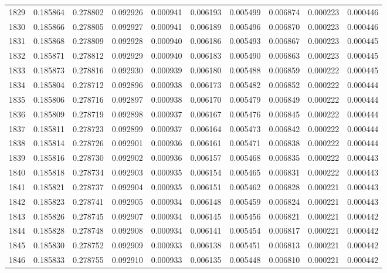 \begin{tabular}{lrrrrrrrrr}
1829 & 0.185864 & 0.278802 & 0.092926 & 0.000941 & 0.006193 & 0.005499 & 0.006874 & 0.000223 & 0.000446 \\
1830 & 0.185866 & 0.278805 & 0.092927 & 0.000941 & 0.006189 & 0.005496 & 0.006870 & 0.000223 & 0.000446 \\
1831 & 0.185868 & 0.278809 & 0.092928 & 0.000940 & 0.006186 & 0.005493 & 0.006867 & 0.000223 & 0.000445 \\
1832 & 0.185871 & 0.278812 & 0.092929 & 0.000940 & 0.006183 & 0.005490 & 0.006863 & 0.000223 & 0.000445 \\
1833 & 0.185873 & 0.278816 & 0.092930 & 0.000939 & 0.006180 & 0.005488 & 0.006859 & 0.000222 & 0.000445 \\
1834 & 0.185804 & 0.278712 & 0.092896 & 0.000938 & 0.006173 & 0.005482 & 0.006852 & 0.000222 & 0.000444 \\
1835 & 0.185806 & 0.278716 & 0.092897 & 0.000938 & 0.006170 & 0.005479 & 0.006849 & 0.000222 & 0.000444 \\
1836 & 0.185809 & 0.278719 & 0.092898 & 0.000937 & 0.006167 & 0.005476 & 0.006845 & 0.000222 & 0.000444 \\
1837 & 0.185811 & 0.278723 & 0.092899 & 0.000937 & 0.006164 & 0.005473 & 0.006842 & 0.000222 & 0.000444 \\
1838 & 0.185814 & 0.278726 & 0.092901 & 0.000936 & 0.006161 & 0.005471 & 0.006838 & 0.000222 & 0.000444 \\
1839 & 0.185816 & 0.278730 & 0.092902 & 0.000936 & 0.006157 & 0.005468 & 0.006835 & 0.000222 & 0.000443 \\
1840 & 0.185818 & 0.278734 & 0.092903 & 0.000935 & 0.006154 & 0.005465 & 0.006831 & 0.000222 & 0.000443 \\
1841 & 0.185821 & 0.278737 & 0.092904 & 0.000935 & 0.006151 & 0.005462 & 0.006828 & 0.000221 & 0.000443 \\
1842 & 0.185823 & 0.278741 & 0.092905 & 0.000934 & 0.006148 & 0.005459 & 0.006824 & 0.000221 & 0.000443 \\
1843 & 0.185826 & 0.278745 & 0.092907 & 0.000934 & 0.006145 & 0.005456 & 0.006821 & 0.000221 & 0.000442 \\
1844 & 0.185828 & 0.278748 & 0.092908 & 0.000934 & 0.006141 & 0.005454 & 0.006817 & 0.000221 & 0.000442 \\
1845 & 0.185830 & 0.278752 & 0.092909 & 0.000933 & 0.006138 & 0.005451 & 0.006813 & 0.000221 & 0.000442 \\
1846 & 0.185833 & 0.278755 & 0.092910 & 0.000933 & 0.006135 & 0.005448 & 0.006810 & 0.000221 & 0.000442 \\

\end{tabular}
